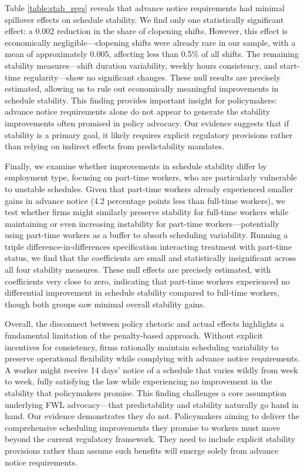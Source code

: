 \documentclass[letterpaper,11pt,leqno]{article}
\theoremstyle{paper}
\begin{document}
Table \ref{table:stab_regs} reveals that advance notice requirements had minimal spillover effects on schedule stability. We find only one statistically significant effect: a 0.002 reduction in the share of clopening shifts. However, this effect is economically negligible—clopening shifts were already rare in our sample, with a mean of approximately 0.005, affecting less than 0.5\% of all shifts. The remaining stability measures—shift duration variability, weekly hours consistency, and start-time regularity—show no significant changes. These null results are precisely estimated, allowing us to rule out economically meaningful improvements in schedule stability. This finding provides important insight for policymakers: advance notice requirements alone do not appear to generate the stability improvements often promised in policy advocacy. Our evidence suggests that if stability is a primary goal, it likely requires explicit regulatory provisions rather than relying on indirect effects from predictability mandates.

Finally, we examine whether improvements in schedule stability differ by employment type, focusing on part-time workers, who are particularly vulnerable to unstable schedules. Given that part-time workers already experienced smaller gains in advance notice (4.2 percentage points less than full-time workers), we test whether firms might similarly preserve stability for full-time workers while maintaining or even increasing instability for part-time workers—potentially using part-time workers as a buffer to absorb scheduling variability. Running a triple difference-in-differences specification interacting treatment with part-time status, we find that the coefficients are small and statistically insignificant across all four stability measures. These null effects are precisely estimated, with coefficients very close to zero, indicating that part-time workers experienced no differential improvement in schedule stability compared to full-time workers, though both groups saw minimal overall stability gains.


Overall, the disconnect between policy rhetoric and actual effects highlights a fundamental limitation of the penalty-based approach. Without explicit incentives for consistency, firms rationally maintain scheduling variability to preserve operational flexibility while complying with advance notice requirements. A worker might receive 14 days' notice of a schedule that varies wildly from week to week, fully satisfying the law while experiencing no improvement in the stability that policymakers promise. This finding challenges a core assumption underlying FWL advocacy—that predictability and stability naturally go hand in hand. Our evidence demonstrates they do not. Policymakers aiming to deliver the comprehensive scheduling improvements they promise to workers must move beyond the current regulatory framework. They need to include explicit stability provisions rather than assume such benefits will emerge solely from advance notice requirements.
\end{document}
